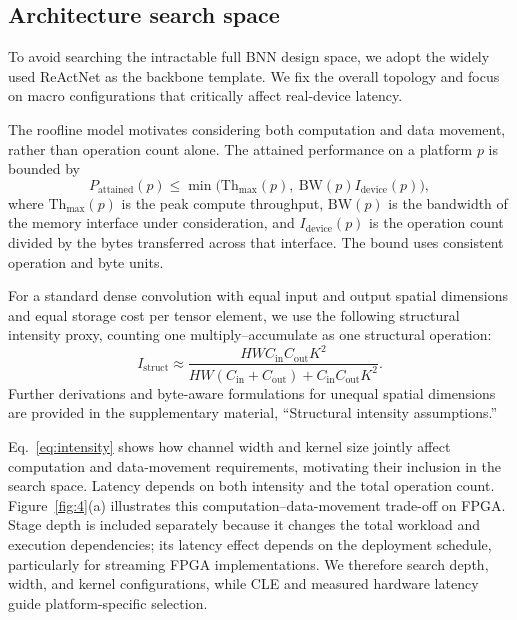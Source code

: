\documentclass[a4paper,fleqn]{cas-sc}
\begin{document}
\subsection{Architecture search space}\label{search_space}
To avoid searching the intractable full BNN design space, we adopt the widely used ReActNet as the backbone template. We fix the overall topology and focus on macro configurations that critically affect real-device latency.

The roofline model motivates considering both computation and data movement, rather than operation count alone. The attained performance on a platform $p$ is bounded by
\begin{equation}
P_{\mathrm{attained}}(p) \leq \min\!\big(\mathrm{Th}_{\max}(p),~\mathrm{BW}(p)I_{\mathrm{device}}(p)\big),
\end{equation}
where $\mathrm{Th}_{\max}(p)$ is the peak compute throughput, $\mathrm{BW}(p)$ is the bandwidth of the memory interface under consideration, and $I_{\mathrm{device}}(p)$ is the operation count divided by the bytes transferred across that interface. The bound uses consistent operation and byte units.

For a standard dense convolution with equal input and output spatial dimensions and equal storage cost per tensor element, we use the following structural intensity proxy, counting one multiply--accumulate as one structural operation:
\begin{equation}
I_{\mathrm{struct}} \approx
\frac{HW C_{\mathrm{in}}C_{\mathrm{out}}K^2}
{HW(C_{\mathrm{in}}+C_{\mathrm{out}})+C_{\mathrm{in}}C_{\mathrm{out}}K^2}.
\label{eq:intensity}
\end{equation}
Further derivations and byte-aware formulations for unequal spatial dimensions are provided in the supplementary material, ``Structural intensity assumptions.''

Eq.~\ref{eq:intensity} shows how channel width and kernel size jointly affect computation and data-movement requirements, motivating their inclusion in the search space. Latency depends on both intensity and the total operation count. Figure~\ref{fig:4}(a) illustrates this computation--data-movement trade-off on FPGA. Stage depth is included separately because it changes the total workload and execution dependencies; its latency effect depends on the deployment schedule, particularly for streaming FPGA implementations. We therefore search depth, width, and kernel configurations, while CLE and measured hardware latency guide platform-specific selection.
\end{document}
